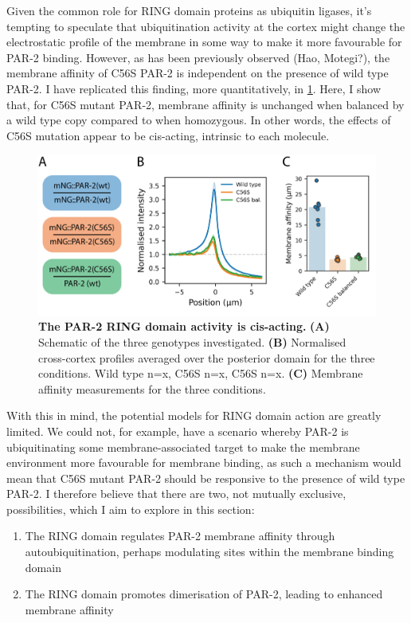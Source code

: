 \documentclass[12pt]{"article"}
\newcommand{\mycaption}[2]{\caption[#1]{\textbf{#1.} #2}}
\begin{document}
Given the common role for RING domain proteins as ubiquitin ligases, it's tempting to speculate that ubiquitination activity at the cortex might change the electrostatic profile of the membrane in some way to make it more favourable for PAR-2 binding. However, as has been previously observed (Hao, Motegi?), the membrane affinity of C56S PAR-2 is independent on the presence of wild type PAR-2. I have replicated this finding, more quantitatively, in \cref{fig:c56s_cis}. Here, I show that, for C56S mutant PAR-2, membrane affinity is unchanged when balanced by a wild type copy compared to when homozygous. In other words, the effects of C56S mutation appear to be cis-acting, intrinsic to each molecule.\\

\begin{figure}
\includegraphics[scale=1]{c56s_cis}
\centering
\mycaption{The PAR-2 RING domain activity is cis-acting}{
\textbf{(A)} Schematic of the three genotypes investigated.
\textbf{(B)} Normalised cross-cortex profiles averaged over the posterior domain for the three conditions. Wild type n=x, C56S n=x, C56S n=x.
\textbf{(C)} Membrane affinity measurements for the three conditions.
}
\label{fig:c56s_cis}
\end{figure}

With this in mind, the potential models for RING domain action are greatly limited. We could not, for example, have a scenario whereby PAR-2 is ubiquitinating some membrane-associated target to make the membrane environment more favourable for membrane binding, as such a mechanism would mean that C56S mutant PAR-2 should be responsive to the presence of wild type PAR-2. I therefore believe that there are two, not mutually exclusive, possibilities, which I aim to explore in this section:
\begin{enumerate}
\item The RING domain regulates PAR-2 membrane affinity through autoubiquitination, perhaps modulating sites within the membrane binding domain
\item The RING domain promotes dimerisation of PAR-2, leading to enhanced membrane affinity
\end{enumerate}
\end{document}
